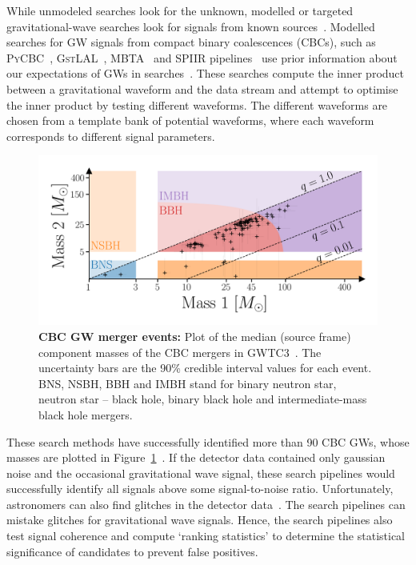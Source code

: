 While unmodeled searches look for the unknown,  modelled or targeted gravitational-wave searches look for signals from known sources~\cite{abbott2016ligo}. %
Modelled searches for GW signals from compact binary coalescences (CBCs), such as \textsc{PyCBC}~\cite{biwer2019pycbc},
\textsc{GstLAL}~\cite{sachdev2019gstlal}, \textsc{MBTA}~\cite{MBTA} and \textsc{SPIIR} pipelines~\cite{SPIIR} use prior information about our expectations of GWs in searches~\cite{gw_search_review}. 
These searches compute the inner product between a gravitational waveform and the data stream and attempt to optimise the inner product by testing different waveforms. 
The different waveforms are chosen from a template bank of potential waveforms, where each waveform corresponds to different signal parameters. 

\begin{figure}
\begin{center}
  \centerline{\includegraphics[width=1.1\linewidth]{src/figures/gw_catalog.png}}
  \caption{\textbf{CBC GW merger events:} Plot of the median (source frame) component masses of the CBC mergers in GWTC3~\cite{gwtc3}. The uncertainty bars are the 90\% credible interval values for each event. BNS, NSBH, BBH and IMBH stand for binary neutron star, neutron star -- black hole, binary black hole and intermediate-mass black hole mergers. }
  \label{fig:cbc_mergers}
\end{center}
\end{figure}

These search methods have successfully identified more than 90 CBC GWs, whose masses are plotted in Figure~\ref{fig:cbc_mergers}~\cite{gwtc3}.
If the detector data contained only gaussian noise and the occasional gravitational wave signal, these search pipelines would successfully identify all signals above some signal-to-noise ratio. 
Unfortunately, astronomers can also find glitches in the detector data~\cite{gw_search_review}. 
The search pipelines can mistake glitches for gravitational wave signals. 
Hence, the search pipelines also test signal coherence and compute `ranking statistics' to determine the statistical significance of candidates to prevent false positives. 

